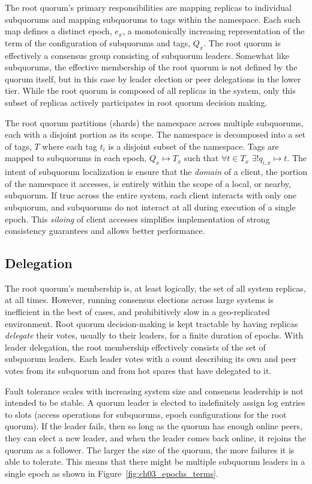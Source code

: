 The root quorum's primary responsibilities are mapping replicas to individual subquorums and mapping subquorums to tags within the namespace.
Each such map defines a distinct epoch, $e_x$, a monotonically increasing representation of the term of the configuration of subquorums and tags, $Q_x$.
The root quorum is effectively a consensus group consisting of subquorum leaders.
Somewhat like subquorums, the effective membership of the root quorum is not defined by the quorum itself, but in this case by leader election or peer delegations in the lower tier.
While the root quorum is composed of all replicas in the system, only this subset of replicas actively participates in root quorum decision making.

The root quorum partitions (shards) the namespace across multiple subquorums, each with a disjoint portion as its scope.
The namespace is decomposed into a set of tags, $T$ where each tag $t_i$ is a disjoint subset of the namespace.
Tags are mapped to subquorums in each epoch, $Q_x \mapsto T_x$ such that $\forall t \in T_x$ $\exists! q_{i,x} \mapsto t$.
The intent of subquorum localization is ensure that the \emph{domain} of a client, the portion of the namespace it accesses, is entirely within the scope of a local, or nearby, subquorum.
If true across the entire system, each client interacts with only one subquorum, and subquorums do not interact at all during execution of a single epoch.
This \emph{siloing} of client accesses simplifies implementation of strong consistency guarantees and allows better performance.

\subsection{Delegation}
\label{ch03_delegation}

The root quorum's membership is, at least logically, the set of all system replicas, at all times.
However, running consensus elections across large systems is inefficient in the best of cases, and prohibitively slow in a geo-replicated environment.
Root quorum decision-making is kept tractable by having replicas \emph{delegate} their votes, usually to their leaders, for a finite duration of epochs.
With leader delegation, the root membership effectively consists of the set of subquorum leaders.
Each leader votes with a count describing its own and peer votes from its
subquorum and from hot spares that have delegated to it.

Fault tolerance scales with increasing system size and consensus leadership is not intended to be stable.
A quorum leader is elected to indefinitely assign log entries to slots (access operations for subquorums, epoch configurations for the root quorum).
If the leader fails, then so long as the quorum has enough online peers, they can elect a new leader, and when the leader comes back online, it rejoins the quorum as a follower.
The larger the size of the quorum, the more failures it is able to tolerate.
This means that there might be multiple subquorum leaders in a single epoch as shown in Figure~\ref{fig:ch03_epochs_terms}.

